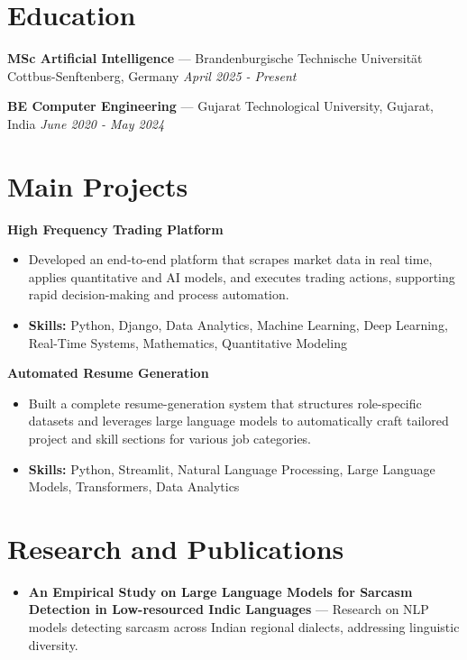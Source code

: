 \documentclass[a4paper,10pt]{article}
\begin{document}
\section*{Education}
\textbf{MSc Artificial Intelligence} — Brandenburgische Technische Universität Cottbus-Senftenberg, Germany \hfill \textit{April 2025 - Present}\par
\vspace{1.5pt}
\textbf{BE Computer Engineering} — Gujarat Technological University, Gujarat, India \hfill \textit{June 2020 - May 2024}\par

\section*{Main Projects}
\textbf{High Frequency Trading Platform}\par
\vspace{1pt}
\begin{itemize}
  \item Developed an end-to-end platform that scrapes market data in real time, applies quantitative and AI models, and executes trading actions, supporting rapid decision-making and process automation.
  \item \textbf{Skills:} Python, Django, Data Analytics, Machine Learning, Deep Learning, Real-Time Systems, Mathematics, Quantitative Modeling
\end{itemize}
\vspace{3pt}
\textbf{Automated Resume Generation}\par
\vspace{1pt}
\begin{itemize}
  \item Built a complete resume-generation system that structures role-specific datasets and leverages large language models to automatically craft tailored project and skill sections for various job categories.
  \item \textbf{Skills:} Python, Streamlit, Natural Language Processing, Large Language Models, Transformers, Data Analytics
\end{itemize}

\section*{Research and Publications}
\begin{itemize}
\item \textbf{An Empirical Study on Large Language Models for Sarcasm Detection in Low-resourced Indic Languages} — Research on NLP models detecting sarcasm across Indian regional dialects, addressing linguistic diversity.
\end{itemize}
\end{document}
